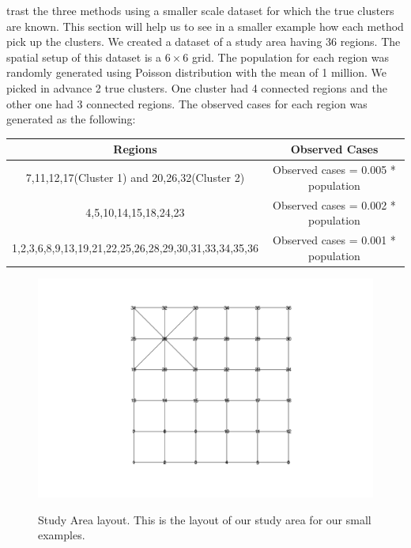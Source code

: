 \documentclass[12pt]{article}
\begin{document}
\begin{enumerate}
trast the three methods using a smaller scale dataset for which the true clusters are known. This section will help us to see in a smaller example how each method pick up the clusters. We created a dataset of a study area having 36 regions. The spatial setup of this dataset is a $6\times6$ grid. The population for each region was randomly generated using Poisson distribution with the mean of 1 million. We picked in advance 2 true clusters. One cluster had 4 connected regions and the other one had 3 connected regions. The observed cases for each region was generated as the following: \\
		
	\begin{tabular}{|c|c|}
	\hline
	Regions & Observed Cases \\
	\hline
	7,11,12,17(Cluster 1) and 20,26,32(Cluster 2) & Observed cases = 0.005 * population \\ 
	4,5,10,14,15,18,24,23 & Observed cases = 0.002 * population \\
	1,2,3,6,8,9,13,19,21,22,25,26,28,29,30,31,33,34,35,36 & Observed cases = 0.001 * population \\
	\hline
	\end{tabular}	
	
	\end{enumerate} 

		
		
	\begin{figure}[!ht]
	\centering
	\includegraphics[scale=0.3]{Area_layout}\\
	\caption{Study Area layout. This is the layout of our study area for our small examples.\label{f:gull}}	
		\end{figure}
	
\end{document}
